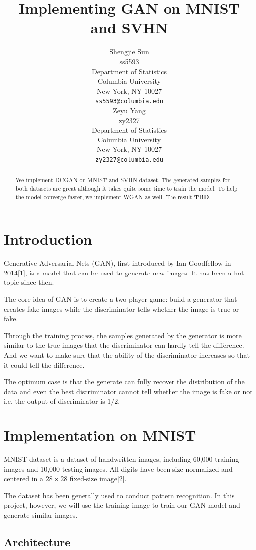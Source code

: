 \documentclass{article}
\title{Implementing GAN on MNIST and SVHN}
\author{%
  Shengjie Sun \\
  ss5593\\
  Department of Statistics\\
  Columbia University\\
  New York, NY 10027 \\
  \texttt{ss5593@columbia.edu} \\
  \And
  Zeyu Yang \\
  zy2327 \\
  Department of Statistics\\
  Columbia University\\
  New York, NY 10027 \\
  \texttt{zy2327@columbia.edu}
}
\begin{document}
\maketitle

\begin{abstract}
  We implement DCGAN on MNIST and SVHN dataset.
  The generated samples for both datasets are great although it takes quite some time to train the model.
  To help the model converge faster, we implement WGAN as well.
  The result \textbf{TBD}.
\end{abstract}

\section{Introduction}

Generative Adversarial Nets (GAN), first introduced by Ian Goodfellow in 2014[1], is a model that can be used to generate new images. 
It has been a hot topic since then.

The core idea of GAN is to create a two-player game:
build a generator that creates fake images while the discriminator tells whether the image is true or fake.

Through the training process, the samples generated by the generator is more similar to the true images that the discriminator can hardly tell the difference. And we want to make sure that the ability of the discriminator increases so that it could tell the difference.

The optimum case is that the generate can fully recover the distribution of the data and even the best discriminator cannot tell whether the image is fake or not i.e. the output of discriminator is $1/2$. 

\section{Implementation on MNIST}

MNIST dataset is a dataset of handwritten images, including 60,000 training images and 10,000 testing images.
All digits have been size-normalized and centered in a $28\times 28$ fixed-size image[2].

The dataset has been generally used to conduct pattern recognition. 
In this project, however, we will use the training image to train our GAN model and generate similar images.

\subsection{Architecture}
\end{document}
